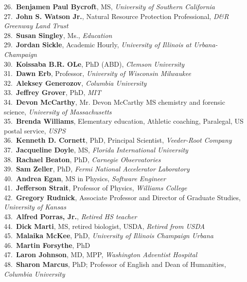 26.~{\bf Benjamen Paul Bycroft}, MS, {\sl University of Southern California} \\
27.~{\bf John S. Watson Jr.}, Natural Resource Protection Professional, {\sl D\&R Greenway Land Trust} \\
28.~{\bf Susan Singley}, Ms., {\sl Education} \\
29.~{\bf Jordan Sickle}, Academic Hourly, {\sl University of Illinois at Urbana-Champaign} \\
30.~{\bf Koissaba B.R. OLe}, PhD (ABD), {\sl Clemson University} \\
31.~{\bf Dawn Erb}, Professor, {\sl University of Wisconsin Milwaukee} \\
32.~{\bf Aleksey Generozov}, {\sl Columbia University } \\
33.~{\bf Jeffrey Grover}, PhD, {\sl MIT} \\
34.~{\bf Devon McCarthy}, Mr.  Devon McCarthy MS chemistry and forensic science, {\sl University of Massachusetts } \\
35.~{\bf Brenda Williams}, Elementary education, Athletic coaching, Paralegal, US postal service, {\sl USPS} \\
36.~{\bf Kenneth D. Cornett}, PhD, Principal Scientist, {\sl Veeder-Root Company} \\
37.~{\bf Jacqueline Doyle}, MS, {\sl Florida International University} \\
38.~{\bf Rachael Beaton}, PhD, {\sl Carnegie Observatories} \\
39.~{\bf Sam Zeller}, PhD, {\sl Fermi National Accelerator Laboratory} \\
40.~{\bf Andrea Egan}, MS in Physics, {\sl Software Engineer} \\
41.~{\bf Jefferson Strait}, Professor of Physics, {\sl Williams College} \\
42.~{\bf Gregory Rudnick}, Associate Professor and Director of Graduate Studies, {\sl University of Kansas} \\
43.~{\bf Alfred Porras, Jr.}, {\sl Retired HS teacher} \\
44.~{\bf Dick Marti}, MS, retired biologist, USDA, {\sl Retired from USDA} \\
45.~{\bf Malaika McKee}, PhD, {\sl University of Illinois Champaign Urbana} \\
46.~{\bf Martin Forsythe}, PhD \\
47.~{\bf Laron Johnson}, MD, MPP, {\sl Washington Adventist Hospital } \\
48.~{\bf Sharon Marcus}, PhD; Professor of English and Dean of Humanities, {\sl Columbia University} \\
